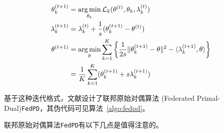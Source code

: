 \begin{subequations}
\label{eq:al-iter}
\begin{align}
\theta_k^{(t+1)} & = \operatorname*{arg\,min}_{\theta_k} \mathcal{L}_k(\theta^{(t)}, \theta_k, \lambda_k^{(t)}) \label{eq:al-iter-local} \\
\lambda_k^{(t+1)} & = \lambda_k^{(t)} + \frac{1}{s} (\theta_k^{(t+1)} - \theta^{(t)}) \label{eq:al-iter-dual} \\
\theta^{(t+1)} & = \operatorname*{arg\,min}_{\theta} \sum\limits_{k=1}^K \left\{ \frac{1}{2s} \lVert \theta_k^{(t+1)} - \theta \rVert^2 - \langle \lambda_k^{(t+1)}, \theta \rangle \right\} \nonumber \\
& = \frac{1}{K} \sum\limits_{k=1}^K (\theta_k^{(t+1)} + s\lambda_k^{(t+1)}) \label{eq:al-iter-global}
\end{align}
\end{subequations}

基于这种迭代格式，文献\parencite{zhang2020fedpd}设计了联邦原始对偶算法 (Federated Primal-Dual)\texttt{FedPD}，其伪代码可见算法~\ref{algo:fedpd}。



联邦原始对偶算法\texttt{FedPD}有以下几点是值得注意的。


